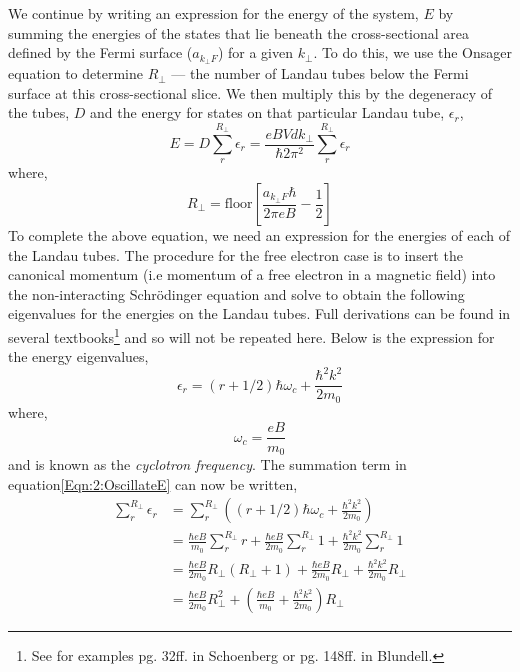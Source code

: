 We continue by writing an expression for the energy of the system, $E$ by summing the energies of the states that lie beneath the cross-sectional area defined by the Fermi surface ($a_{k_\perp F}$) for a given $k_\perp$. To do this, we use the Onsager equation to determine $R_\perp$ --- the number of Landau tubes below the Fermi surface at this cross-sectional slice. We then multiply this by the degeneracy of the tubes, $D$ and the energy for states on that particular Landau tube, $\epsilon_r$,
\begin{equation}
\label{Eqn:2:OscillateE}
E = D\sum_{r}^{R_\perp}\epsilon_r = \frac{eBVdk_\perp}{\hbar 2 \pi^2}\sum_{r}^{R_\perp}\epsilon_r
\end{equation}
 where,
\begin{equation}
R_\perp = \textrm{floor}\left[\frac{a_{k_\perp F}\hbar}{2\pi e B} - \frac{1}{2}\right]
\end{equation}
To complete the above equation, we need an expression for the energies of each of the Landau tubes. The procedure for the free electron case is to insert the canonical momentum (i.e momentum of a free electron in a magnetic field) into the non-interacting Schr\"odinger equation and solve to obtain the following eigenvalues for the energies on the Landau tubes. Full derivations can be found in several textbooks\footnote{See for examples pg. 32ff. in Schoenberg\cite{Schoenberg1984} or pg. 148ff. in Blundell\cite{Blundell2001}.} and so will  not be repeated here. Below is the expression for the energy eigenvalues,
\begin{equation}
\epsilon_r=(r+1/2) \hbar \omega_c + \frac{\hbar^2 k^2}{2m_0}
\end{equation}
where,
\begin{equation}
\omega_c = \frac{eB}{m_0}
\end{equation}
and is known as the \textit{cyclotron frequency}. The summation term in equation\ref{Eqn:2:OscillateE} can now be written,
\begin{align*}
\sum_r^{R_\perp}\epsilon_r &= \sum_r^{R_\perp}\left( (r+1/2) \hbar \omega_c + \frac{\hbar^2 k^2}{2m_0} \right) \\
    &= \frac{\hbar eB}{m_0}\sum_r^{R_\perp}r + \frac{\hbar eB}{2m_0}\sum_r^{R_\perp}1 + \frac{\hbar^2 k^2}{2m_0}\sum_r^{R_\perp}1 \\
    &= \frac{\hbar eB}{2 m_0} R_\perp(R_\perp + 1) + \frac{\hbar eB}{2m_0}R_\perp + \frac{\hbar^2 k^2}{2m_0}R_\perp \\
    &= \frac{\hbar eB}{2m_0}R_\perp^2 + \left(\frac{\hbar eB}{m_0} + \frac{\hbar^2 k^2}{2m_0}\right)R_\perp
\end{align*}
